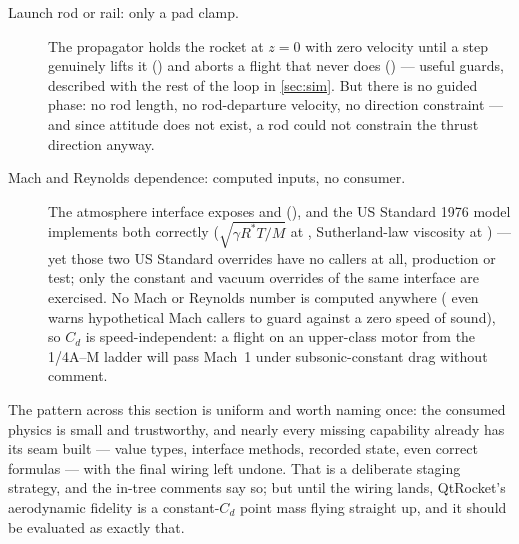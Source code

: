 \begin{description}
  \item[Launch rod or rail: only a pad clamp. \fpartial] The propagator holds the rocket at
  $z = 0$ with zero velocity until a step genuinely lifts it () and
  aborts a flight that never does () --- useful guards, described
  with the rest of the loop in \cref{sec:sim}. But there is no guided phase: no rod length, no
  rod-departure velocity, no direction constraint --- and since attitude does not exist, a rod
  could not constrain the thrust direction anyway.

  \item[Mach and Reynolds dependence: computed inputs, no consumer. \fabsent] The atmosphere
  interface exposes  and 
  (), and the US Standard 1976 model implements both correctly
  ($\sqrt{\gamma R^{*} T / M}$ at , Sutherland-law
  viscosity at ) --- yet those two US Standard overrides
  have no callers at all, production or test; only the constant and vacuum overrides of the same
  interface are exercised. No Mach or Reynolds number is computed anywhere
  ( even warns hypothetical Mach callers to guard against a zero
  speed of sound), so $C_d$ is speed-independent: a flight on an upper-class motor from the
  1/4A--M ladder will pass Mach~1 under subsonic-constant drag without comment.
\end{description}

The pattern across this section is uniform and worth naming once: the consumed physics is small
and trustworthy, and nearly every missing capability already has its seam built --- value types,
interface methods, recorded state, even correct formulas --- with the final wiring left undone.
That is a deliberate staging strategy, and the in-tree comments say so; but until the wiring
lands, QtRocket's aerodynamic fidelity is a constant-$C_d$ point mass flying straight up, and it
should be evaluated as exactly that.
